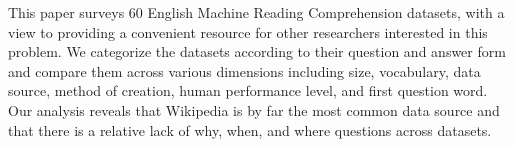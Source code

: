 This paper surveys 60 English Machine Reading Comprehension datasets, with a view to providing a convenient resource for other researchers interested in this problem. We categorize the datasets according to their question and answer form and compare them across various dimensions including size, vocabulary, data source, method of creation, human performance level, and first question word. Our analysis reveals that Wikipedia is by far the most common data source and that there is a relative lack of why, when, and where questions across datasets.
